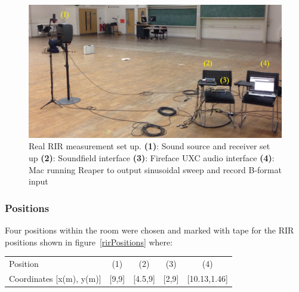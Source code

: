 \documentclass[../../main.tex]{subfiles}
\begin{document}
		\begin{figure}[H]
			\begin{center}
				\includegraphics[scale = 0.14]{Sections/Implementation/RealRIRs/images/realRIRSetup_edit.jpg} 
				\caption{Real \ac{RIR} measurement set up. \textbf{(1)}: Sound source and receiver set up \textbf{(2)}: Soundfield interface \textbf{(3)}: Fireface UXC audio interface \textbf{(4)}: Mac running Reaper to output sinusoidal sweep and record B-format input}
				\label{realRIRSetup}
			\end{center}
		\end{figure}

	\subsubsection{Positions}

		Four positions within the room were chosen and marked with tape for the \ac{RIR} positions shown in figure~\ref{rirPositions} where:

		\begin{center}
			\begin{tabular}{l| c c c c}
				Position & (1) & (2) & (3) & (4) \\
			Coordinates [x(m), y(m)] & [9,9] & [4.5,9] & [2,9] &  [10.13,1.46]\\
			\end{tabular}
		\end{center}
\end{document}
